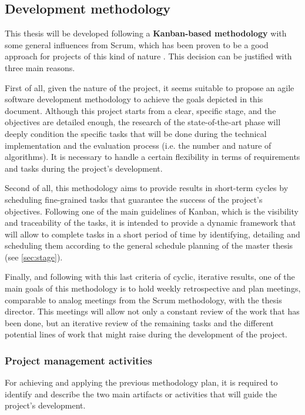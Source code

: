 \documentclass[11pt]{article}
\begin{document}
\subsection{Development methodology}

This thesis will be developed following a \textbf{Kanban-based methodology} with some general influences from Scrum, which has been proven to be a good approach for projects of this kind of nature \cite{kanban}. This decision can be justified with three main reasons.

First of all, given the nature of the project, it seems suitable to propose an agile software development methodology to achieve the goals depicted in this document. Although this project starts from a clear, specific stage, and the objectives are detailed enough, the research of the state-of-the-art phase will deeply condition the specific tasks that will be done during the technical implementation and the evaluation process (i.e. the number and nature of algorithms). It is necessary to handle a certain flexibility in terms of requirements and tasks during the project's development. 

Second of all, this methodology aims to provide results in short-term cycles by scheduling fine-grained tasks that guarantee the success of the project's objectives. Following one of the main guidelines of Kanban, which is the visibility and traceability of the tasks, it is intended to provide a dynamic framework that will allow to complete tasks in a short period of time by identifying, detailing and scheduling them according to the general schedule planning of the master thesis (see \ref{sec:stage}).

Finally, and following with this last criteria of cyclic, iterative results, one of the main goals of this methodology is to hold weekly retrospective and plan meetings, comparable to analog meetings from the Scrum methodology, with the thesis director. This meetings will allow not only a constant review of the work that has been done, but an iterative review of the remaining tasks and the different potential lines of work that might raise during the development of the project. 

\subsubsection{Project management activities}

For achieving and applying the previous methodology plan, it is required to identify and describe the two main artifacts or activities that will guide the project's development.
\end{document}
